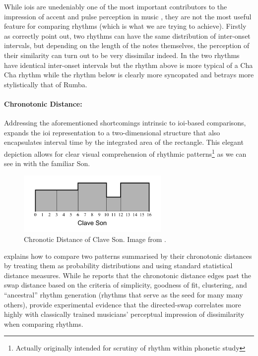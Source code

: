 While \acrshort{ioi}s are unedeniably one of the most important contributors to the impression of accent and pulse perception in music \citep{Parncutt1994}, they are not the most useful feature for comparing rhythms (which is what we are trying to achieve). Firstly as \cite{Dixon2004} correctly point out, two rhythms can have the same distribution of inter-onset intervals, but depending on the length of the notes themselves, the perception of their similarity can turn out to be very dissimilar indeed. In  the two rhythms have identical inter-onset intervals but the rhythm above is more typical of a Cha Cha rhythm while the rhythm below is clearly more syncopated and betrays more stylistically that of Rumba.


\paragraph{Chronotonic Distance:} 
Addressing the aforementioned shortcomings intrinsic to \acrshort{ioi}-based comparisons, \cite{gustafson1987new} expands the \acrshort{ioi} representation to a two-dimensional structure that also encapsulates interval time by the integrated area of the rectangle. This elegant depiction allows for clear visual comprehension of rhythmic patterns\footnote{Actually originally intended for scrutiny of rhythm within phonetic study} as we can see in  with the familiar Son. 

\begin{figure}
	\begin{center}
		\includegraphics[width=0.65\textwidth]{ch03_symbolic/figures/chronotonic.png}
	\end{center}
	\caption[Chronotic Distance of Clave Son]{Chronotic Distance of Clave Son. Image from \cite{Toussaint2004}.}
	\label{fig:chronotnic}
\end{figure}

\citep{Toussaint2004} explains how to compare two patterns summarised by their chronotonic distances by treating them as probability distributions and using standard statistical distance measures. While he reports that the chronotonic distance edges past the swap distance based on the criteria of simplicity, goodness of fit, clustering, and ``ancestral'' rhythm generation (rhythms that serve as the seed for many many others), \cite{Guastavino2008} provide experimental evidence that the directed-swap correlates more highly with classically trained musicians’ perceptual impression of dissimilarity when comparing rhythms.

